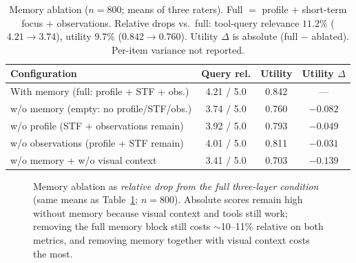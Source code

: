 \documentclass[11pt,a4paper]{article}
\begin{document}
\begin{table}[t]
\centering
\caption{Memory ablation ($n{=}800$; means of three raters). Full $=$ profile + short-term focus + observations. Relative drops vs.\ full: tool-query relevance $11.2\%$ ($4.21\!\to\!3.74$), utility $9.7\%$ ($0.842\!\to\!0.760$). Utility $\Delta$ is absolute (full $-$ ablated). Per-item variance not reported.}
\label{tab:memory_ablation}
\begin{tabular}{lccc}
\toprule
\textbf{Configuration} & \textbf{Query rel.} & \textbf{Utility} & \textbf{Utility $\Delta$} \\
\midrule
With memory (full: profile + STF + obs.) & 4.21 / 5.0 & 0.842 & --- \\
w/o memory (empty: no profile/STF/obs.) & 3.74 / 5.0 & 0.760 & $-0.082$ \\
w/o profile (STF + observations remain) & 3.92 / 5.0 & 0.793 & $-0.049$ \\
w/o observations (profile + STF remain) & 4.01 / 5.0 & 0.811 & $-0.031$ \\
w/o memory + w/o visual context & 3.41 / 5.0 & 0.703 & $-0.139$ \\
\bottomrule
\end{tabular}
\end{table}

\begin{figure}[t]
\centering
{}
\caption{Memory ablation as \emph{relative drop from the full three-layer condition} (same means as Table~\ref{tab:memory_ablation}; $n{=}800$). Absolute scores remain high without memory because visual context and tools still work; removing the full memory block still costs $\sim$10--11\% relative on both metrics, and removing memory together with visual context costs the most.}
\label{fig:memory_ablation}
\end{figure}
\end{document}
